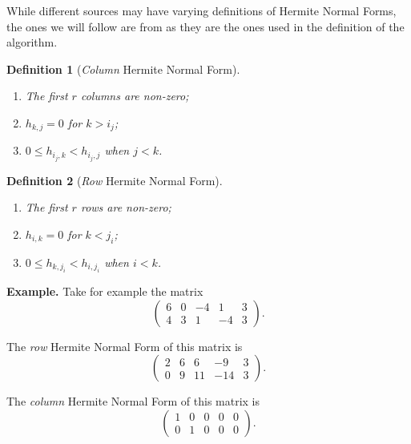 \documentclass[oneside, a4paper, onecolumn, 11pt]{article}
\newtheorem{definition}{Definition}
\newenvironment{example}[1][Example]{\textbf{#1.} }{\medskip}
\begin{document}
While different sources may have varying definitions of Hermite Normal Forms, the ones we will follow are from \cite{Hubert2013} as they are the ones used in the definition of the algorithm.

\begin{definition}[\textit{Column} Hermite Normal Form]
    \begin{enumerate}[label=(\roman*)]
        \item The first \(r\) columns are non-zero;
        \item \(h_{k, j} = 0\) for \(k > i_j\);
        \item \(0 \le h_{i_j, k} < h_{i_j, j}\) when \(j < k\).
    \end{enumerate}
\end{definition}

\begin{definition}[\textit{Row} Hermite Normal Form]
    \begin{enumerate}[label=(\roman*)]
        \item The first \(r\) rows are non-zero;
        \item \(h_{i, k} = 0\) for \(k < j_i\);
        \item \(0 \le h_{k, j_i} < h_{i, j_i}\) when \(i < k\).
    \end{enumerate}
\end{definition}


\begin{example}
    Take for example the matrix
    \[
        \begin{pmatrix}
            6 & 0 & -4 & 1  & 3 \\
            4 & 3 & 1  & -4 & 3
        \end{pmatrix}.
    \]

    The \textit{row} Hermite Normal Form of this matrix is
    \[
        \begin{pmatrix}
            2 & 6 & 6  & -9  & 3 \\
            0 & 9 & 11 & -14 & 3
        \end{pmatrix}.
    \]

    The \textit{column} Hermite Normal Form of this matrix is
    \[
        \begin{pmatrix}
            1 & 0 & 0 & 0 & 0 \\
            0 & 1 & 0 & 0 & 0
        \end{pmatrix}.
    \]
\end{example}
\end{document}
